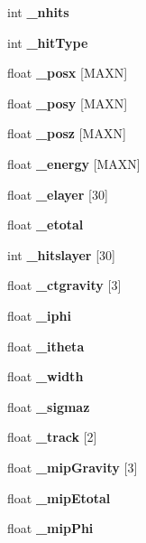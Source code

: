 \begin{CompactItemize}
\item 
int {\bf \_\-nhits}\label{classCaliceEcalHitInfo_p14}

\item 
int {\bf \_\-hit\-Type}\label{classCaliceEcalHitInfo_p15}

\item 
float {\bf \_\-posx} [MAXN]\label{classCaliceEcalHitInfo_p16}

\item 
float {\bf \_\-posy} [MAXN]\label{classCaliceEcalHitInfo_p17}

\item 
float {\bf \_\-posz} [MAXN]\label{classCaliceEcalHitInfo_p18}

\item 
float {\bf \_\-energy} [MAXN]\label{classCaliceEcalHitInfo_p19}

\item 
float {\bf \_\-elayer} [30]\label{classCaliceEcalHitInfo_p20}

\item 
float {\bf \_\-etotal}\label{classCaliceEcalHitInfo_p21}

\item 
int {\bf \_\-hitslayer} [30]\label{classCaliceEcalHitInfo_p22}

\item 
float {\bf \_\-ctgravity} [3]\label{classCaliceEcalHitInfo_p23}

\item 
float {\bf \_\-iphi}\label{classCaliceEcalHitInfo_p24}

\item 
float {\bf \_\-itheta}\label{classCaliceEcalHitInfo_p25}

\item 
float {\bf \_\-width}\label{classCaliceEcalHitInfo_p26}

\item 
float {\bf \_\-sigmaz}\label{classCaliceEcalHitInfo_p27}

\item 
float {\bf \_\-track} [2]\label{classCaliceEcalHitInfo_p28}

\item 
float {\bf \_\-mip\-Gravity} [3]\label{classCaliceEcalHitInfo_p29}

\item 
float {\bf \_\-mip\-Etotal}\label{classCaliceEcalHitInfo_p30}

\item 
float {\bf \_\-mip\-Phi}\label{classCaliceEcalHitInfo_p31}


\end{CompactItemize}
